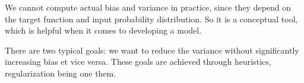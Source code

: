     We cannot compute actual bias and variance in practice, since they depend 
    on the target function and input probability distribution. So it is a 
    conceptual tool, which is helpful when it comes to developing a model.
    
    There are two typical goals: we want to reduce the variance without 
    significantly increasing bias et vice versa. These goals are achieved 
    through heuristics, regularization being one them.
